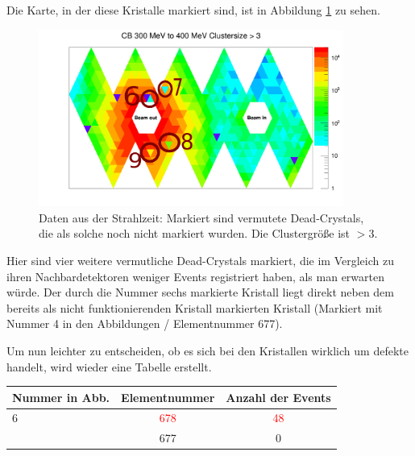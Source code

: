 \documentclass[a4paper,11pt,oneside,final,german,openbib,pdftex]{scrbook}
\begin{document}
{Die Karte, in der diese Kristalle markiert sind, ist in Abbildung \ref{fig:Vermutete-Dead-Crystals-Map} zu sehen.

\begin{figure}[h!]
	\begin{center}
		\includegraphics[width=100mm]{NewCalib/Strahlzeit2014/ClusterSizeNew/20172504StrahlzeitMoreDead}
	\end{center}
\caption[Strahlzeit: Vermutliche Dead-Crystals]{Daten aus der Strahlzeit: Markiert sind vermutete Dead-Crystals, die als solche noch nicht markiert wurden. Die Clustergröße ist $>$3.}
\label{fig:Vermutete-Dead-Crystals-Map}

\end{figure}

Hier sind vier weitere vermutliche Dead-Crystals markiert, die im Vergleich zu ihren Nachbardetektoren weniger Events registriert haben, als man erwarten w\"urde. Der durch die Nummer sechs markierte Kristall liegt direkt neben dem bereits als nicht funktionierenden Kristall markierten Kristall (Markiert mit Nummer 4 in den Abbildungen / Elementnummer 677). 
 
 Um nun leichter zu entscheiden, ob es sich bei den Kristallen wirklich um defekte handelt, wird wieder eine Tabelle erstellt.
 
 
 \begin{table}[h!]
 \begin{center}
 	
 \begin{tabular}{lcc}
 
 	
 	Nummer in Abb. & Elementnummer&Anzahl der Events \\
	 
 	\hline
 	6& \textcolor{red}{678} &\textcolor{red}{48} \\
 	 
 	 & 677&0 \\
 	

\end{tabular}
\end{center}
\end{table}}
\end{document}

